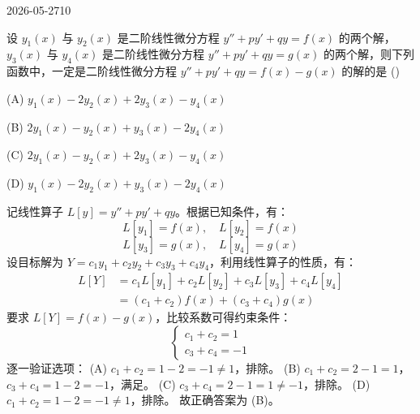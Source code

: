 \begin{mistake}{2026-05-27}{10}

\begin{problemcontent}
设 \(y_1(x)\) 与 \(y_2(x)\) 是二阶线性微分方程 \(y'' + py' + qy = f(x)\) 的两个解，\(y_3(x)\) 与 \(y_4(x)\) 是二阶线性微分方程 \(y'' + py' + qy = g(x)\) 的两个解，则下列函数中，一定是二阶线性微分方程 \(y'' + py' + qy = f(x) - g(x)\) 的解的是 ()

(A) \(y_1(x) - 2y_2(x) + 2y_3(x) - y_4(x)\)

(B) \(2y_1(x) - y_2(x) + y_3(x) - 2y_4(x)\)

(C) \(2y_1(x) - y_2(x) + 2y_3(x) - y_4(x)\)

(D) \(y_1(x) - 2y_2(x) + y_3(x) - 2y_4(x)\)
\end{problemcontent}

\begin{solutioncontent}
记线性算子 \(L[y] = y'' + py' + qy\)。根据已知条件，有：
\[ L[y_1] = f(x), \quad L[y_2] = f(x) \]
\[ L[y_3] = g(x), \quad L[y_4] = g(x) \]
设目标解为 \(Y = c_1 y_1 + c_2 y_2 + c_3 y_3 + c_4 y_4\)，利用线性算子的性质，有：
\[
\begin{aligned}
L[Y] &= c_1 L[y_1] + c_2 L[y_2] + c_3 L[y_3] + c_4 L[y_4] \\
&= (c_1 + c_2) f(x) + (c_3 + c_4) g(x)
\end{aligned}
\]
要求 \(L[Y] = f(x) - g(x)\)，比较系数可得约束条件：
\[
\begin{cases}
c_1 + c_2 = 1 \\
c_3 + c_4 = -1
\end{cases}
\]
逐一验证选项：
(A) \(c_1+c_2 = 1-2 = -1 \neq 1\)，排除。
(B) \(c_1+c_2 = 2-1 = 1\)，\(c_3+c_4 = 1-2 = -1\)，满足。
(C) \(c_3+c_4 = 2-1 = 1 \neq -1\)，排除。
(D) \(c_1+c_2 = 1-2 = -1 \neq 1\)，排除。
故正确答案为 (B)。
\end{solutioncontent}


\end{mistake}
